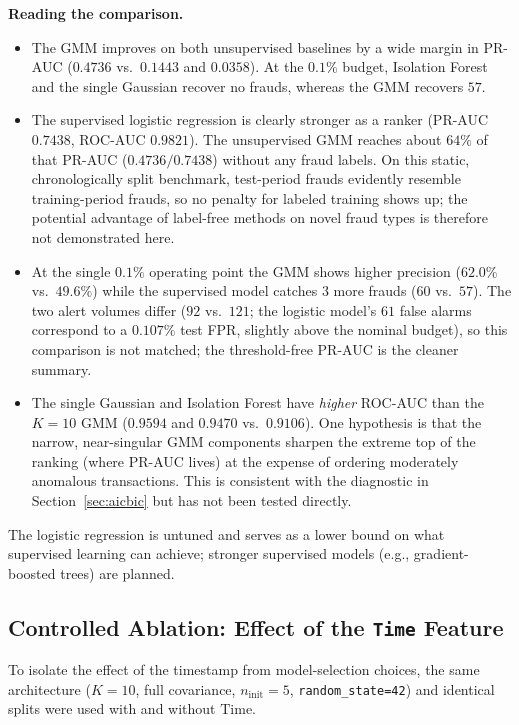 \documentclass[11pt, a4paper]{article}
\begin{document}
\textbf{Reading the comparison.}
\begin{itemize}
    \item The GMM improves on both unsupervised baselines by a wide margin in PR-AUC ($0.4736$ vs.\ $0.1443$ and $0.0358$). At the $0.1\%$ budget, Isolation Forest and the single Gaussian recover no frauds, whereas the GMM recovers $57$.
    \item The supervised logistic regression is clearly stronger as a ranker (PR-AUC $0.7438$, ROC-AUC $0.9821$). The unsupervised GMM reaches about $64\%$ of that PR-AUC ($0.4736/0.7438$) without any fraud labels. On this static, chronologically split benchmark, test-period frauds evidently resemble training-period frauds, so no penalty for labeled training shows up; the potential advantage of label-free methods on novel fraud types is therefore not demonstrated here.
    \item At the single $0.1\%$ operating point the GMM shows higher precision ($62.0\%$ vs.\ $49.6\%$) while the supervised model catches $3$ more frauds ($60$ vs.\ $57$). The two alert volumes differ ($92$ vs.\ $121$; the logistic model's $61$ false alarms correspond to a $0.107\%$ test FPR, slightly above the nominal budget), so this comparison is not matched; the threshold-free PR-AUC is the cleaner summary.
    \item The single Gaussian and Isolation Forest have \emph{higher} ROC-AUC than the $K=10$ GMM ($0.9594$ and $0.9470$ vs.\ $0.9106$). One hypothesis is that the narrow, near-singular GMM components sharpen the extreme top of the ranking (where PR-AUC lives) at the expense of ordering moderately anomalous transactions. This is consistent with the diagnostic in Section~\ref{sec:aicbic} but has not been tested directly.
\end{itemize}
The logistic regression is untuned and serves as a lower bound on what supervised learning can achieve; stronger supervised models (e.g., gradient-boosted trees) are planned.

\subsection{Controlled Ablation: Effect of the \texttt{Time} Feature}
\label{sec:ablation}
To isolate the effect of the timestamp from model-selection choices, the same architecture ($K=10$, full covariance, $n_{\text{init}}=5$, \texttt{random\_state=42}) and identical splits were used with and without $\text{Time}$.
\end{document}
